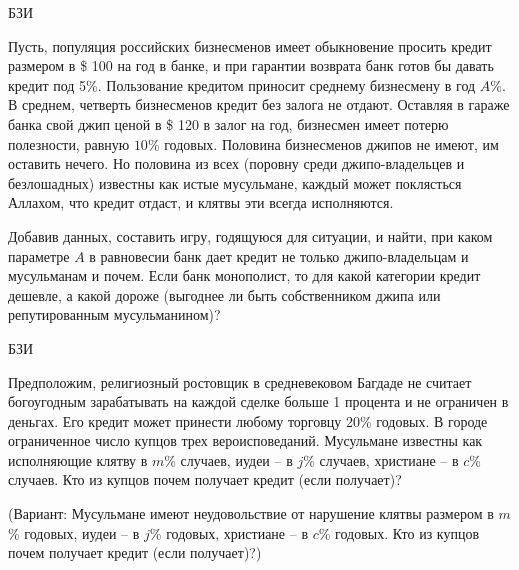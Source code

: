 \begin{problem}\begin{source}
БЗИ
\end{source}
Пусть, популяция российских бизнесменов имеет обыкновение
просить кредит размером в \$ 100 на год в банке, и при
гарантии возврата банк готов бы давать кредит под 5\%.
Пользование кредитом приносит среднему бизнесмену в год
$A$\%. В среднем, четверть бизнесменов кредит без залога не
отдают. Оставляя в гараже банка свой джип ценой в \$ 120  в
залог на год, бизнесмен имеет потерю полезности, равную
$10$\% годовых. Половина бизнесменов джипов не имеют, им
оставить нечего. Но половина из всех (поровну среди
джипо-владельцев и безлошадных) известны как истые
мусульмане, каждый может поклясться Аллахом, что кредит
отдаст, и клятвы эти всегда исполняются.

Добавив данных, составить игру, годящуюся для ситуации, и
найти, при каком параметре $A$ в равновесии банк дает
кредит не только джипо-владельцам и мусульманам и почем.
Если банк монополист, то для какой категории кредит
дешевле, а какой дороже (выгоднее ли быть собственником
джипа или репутированным мусульманином)?

\begin{sol}

\end{sol}
\end{problem}



\begin{problem}\begin{source}
БЗИ
\end{source}
Предположим, религиозный ростовщик в средневековом Багдаде
не считает богоугодным зарабатывать на каждой сделке больше
1 процента и не ограничен в деньгах. Его кредит может
принести любому торговцу 20\% годовых. В городе
ограниченное число купцов трех вероисповеданий. Мусульмане
известны как исполняющие клятву в $m$\% случаев, иудеи -- в
$j$\% случаев, христиане -- в $c$\% случаев. Кто из купцов
почем получает кредит (если получает)?

(Вариант: Мусульмане имеют неудовольствие от нарушение
клятвы размером в $m$\% годовых, иудеи -- в $j$\% годовых,
христиане -- в $c$\% годовых. Кто из купцов почем получает
кредит (если получает)?)

\begin{sol}

\end{sol}
\end{problem}






